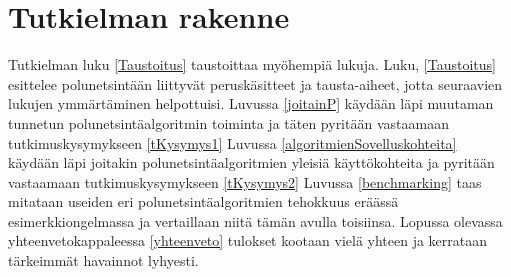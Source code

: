 \section{Tutkielman rakenne}\label{tRakenne}
Tutkielman luku \ref{Taustoitus} taustoittaa myöhempiä lukuja. Luku, 
\ref{Taustoitus} esittelee polunetsintään liittyvät peruskäsitteet ja 
tausta-aiheet, jotta seuraavien lukujen ymmärtäminen helpottuisi. 
Luvussa \ref{joitainP} käydään läpi muutaman tunnetun polunetsintäalgoritmin 
toiminta ja täten pyritään vastaamaan tutkimuskysymykseen \ref{tKysymys1} 
Luvussa \ref{algoritmienSovelluskohteita} käydään läpi joitakin 
polunetsintäalgoritmien yleisiä käyttökohteita ja pyritään vastaamaan 
tutkimuskysymykseen \ref{tKysymys2} Luvussa \ref{benchmarking} taas mitataan 
useiden eri polunetsintäalgoritmien tehokkuus eräässä esimerkkiongelmassa ja 
vertaillaan niitä tämän avulla toisiinsa. Lopussa olevassa 
yhteenvetokappaleessa \ref{yhteenveto} tulokset kootaan vielä yhteen ja 
kerrataan tärkeimmät havainnot lyhyesti.
